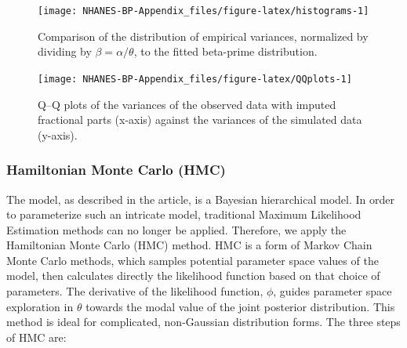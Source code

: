 \documentclass[
]{article}
\begin{document}
\begin{landscape}
\begin{figure}

{\centering \texttt{[image: NHANES-BP-Appendix\_files/figure-latex/histograms-1]} 

}

\caption{Comparison of the distribution of empirical variances, normalized by dividing by $\beta=\alpha/\theta$, to the fitted beta-prime distribution.}\label{fig:histograms}
\end{figure}

\end{landscape}

\begin{figure}

{\centering \texttt{[image: NHANES-BP-Appendix\_files/figure-latex/QQplots-1]} 

}

\caption{Q--Q plots of the variances of the observed data with imputed fractional parts (x-axis) against the variances of the simulated data (y-axis).}\label{fig:QQplots}
\end{figure}

\hypertarget{hamiltonian-monte-carlo-hmc}{%
\subsubsection{Hamiltonian Monte Carlo (HMC)}\label{hamiltonian-monte-carlo-hmc}}

The model, as described in the article, is a Bayesian hierarchical model. In order to parameterize such an intricate model, traditional Maximum Likelihood Estimation methods can no longer be applied. Therefore, we apply the Hamiltonian Monte Carlo (HMC) method. HMC is a form of Markov Chain Monte Carlo methods, which samples potential parameter space values of the model, then calculates directly the likelihood function based on that choice of parameters. The derivative of the likelihood function, \(\phi\), guides parameter space exploration in \(\theta\) towards the modal value of the joint posterior distribution. This method is ideal for complicated, non-Gaussian distribution forms. The three steps of HMC are:
\end{document}
